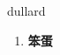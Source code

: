
\begin{frame}
{\huge dullard}
\begin{center}
\begin{enumerate}\Large
  \item \textbf{笨蛋}
\end{enumerate}
\end{center}
\end{frame}
